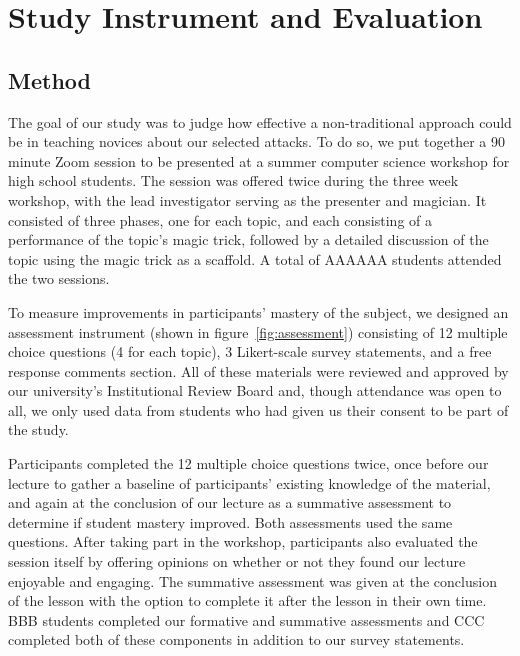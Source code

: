 \section{Study Instrument and Evaluation}
\label{SEC:evaluation}

\subsection{Method}

The goal of our study was to judge how effective a non-traditional approach
could be in teaching novices about our selected attacks.  To do so,
we put together a 90 minute Zoom session to be presented at a summer
computer science workshop for high school students.  The session was
offered twice during the three week workshop, with the lead investigator
serving as the presenter and magician.  It consisted of three phases, one
for each topic, and each consisting of a performance of the topic's magic
trick, followed by a detailed discussion of the topic using the magic trick
as a scaffold.  A total of AAAAAA students attended the two sessions.

To measure improvements in participants' mastery of the subject, we
designed an assessment instrument (shown in figure~\ref{fig:assessment})
consisting of
12 multiple choice questions (4 for each topic),
3 Likert-scale survey statements,
and a free response comments section.
All of these materials were reviewed and approved by our university's
Institutional Review Board and, though attendance was open to all, we only
used data from students who had given us their consent to be part of the
study.

Participants completed the 12 multiple choice questions twice,
once before our lecture to gather a baseline of
participants' existing knowledge of the material,
and again at the conclusion of our
lecture as a summative assessment to determine if student mastery improved.
Both assessments used the same questions.
After taking part in the workshop, participants also evaluated the session
itself by offering opinions on whether or not they found our lecture
enjoyable and engaging.
The summative assessment was given at the conclusion of the lesson
with the option to complete it after the lesson in their own time.
BBB students completed our formative and summative assessments and CCC
completed both of these components in addition to our survey statements.

